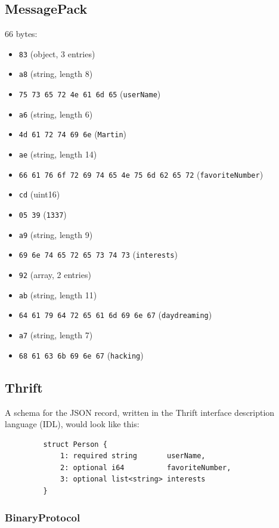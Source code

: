 \documentclass[12pt, titlepage]{article}
\begin{document}
\subsection{MessagePack}

66 bytes:

\begin{itemize}
    \item \texttt{83} (object, 3 entries)
    \item \texttt{a8} (string, length 8)
    \item \texttt{75 73 65 72 4e 61 6d 65} (\texttt{userName})
    \item \texttt{a6} (string, length 6)
    \item \texttt{4d 61 72 74 69 6e} (\texttt{Martin})
    \item \texttt{ae} (string, length 14)
    \item \texttt{66 61 76 6f 72 69 74 65 4e 75 6d 62 65 72} (\texttt{favoriteNumber})
    \item \texttt{cd} (uint16)
    \item \texttt{05 39} (\texttt{1337})
    \item \texttt{a9} (string, length 9)
    \item \texttt{69 6e 74 65 72 65 73 74 73} (\texttt{interests})
    \item \texttt{92} (array, 2 entries)
    \item \texttt{ab} (string, length 11)
    \item \texttt{64 61 79 64 72 65 61 6d 69 6e 67} (\texttt{daydreaming})
    \item \texttt{a7} (string, length 7)
    \item \texttt{68 61 63 6b 69 6e 67} (\texttt{hacking})
\end{itemize}

\subsection{Thrift}

A schema for the JSON record, written in the Thrift interface description language (IDL), would look like this:

\begin{verbatim}
         struct Person {
             1: required string       userName,
             2: optional i64          favoriteNumber,
             3: optional list<string> interests
         }
\end{verbatim}

\subsubsection{BinaryProtocol}
\end{document}
